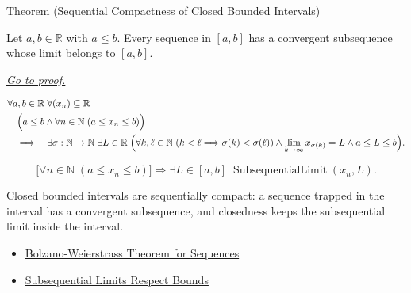 
\begin{theorembox}{Theorem (Sequential Compactness of Closed Bounded Intervals)}
\begin{theorem}
\label{thm:sequential-compactness-closed-bounded-interval}
Let $a,b\in\mathbb{R}$ with $a\le b$. Every sequence in $[a,b]$ has a
convergent subsequence whose limit belongs to $[a,b]$.

\smallskip
\noindent
\hyperref[prf:sequential-compactness-closed-bounded-interval]{\textit{Go to proof.}}
\end{theorem}
\end{theorembox}

\begin{remark*}
\[
\begin{aligned}
&\forall a,b\in\mathbb{R}\;\forall (x_n)\subseteq\mathbb{R}\\
&\quad\Bigl(
  a\le b
  \land
  \forall n\in\mathbb{N}\;(a\le x_n\le b)
\Bigr)\\
&\quad\Longrightarrow\quad
\exists \sigma:\mathbb{N}\to\mathbb{N}\;\exists L\in\mathbb{R}\;
\Bigl(
  \forall k,\ell\in\mathbb{N}\;(k<\ell\Longrightarrow\sigma(k)<\sigma(\ell))
  \land
  \lim_{k\to\infty}x_{\sigma(k)}=L
  \land
  a\le L\le b
\Bigr).
\end{aligned}
\]
\end{remark*}

\begin{remark*}
\[
\bigl[\forall n\in\mathbb{N}\;(a\le x_n\le b)\bigr]
\Longrightarrow
\exists L\in[a,b]\;\operatorname{SubsequentialLimit}(x_n,L).
\]
\end{remark*}

\begin{remark*}[Interpretation]
Closed bounded intervals are sequentially compact: a sequence trapped in the
interval has a convergent subsequence, and closedness keeps the subsequential
limit inside the interval.
\end{remark*}

\begin{dependencies}
\begin{itemize}
  \item \hyperref[thm:bolzano-weierstrass-sequences]{Bolzano-Weierstrass Theorem for Sequences}
  \item \hyperref[thm:subsequential-limits-respect-bounds]{Subsequential Limits Respect Bounds}
\end{itemize}
\end{dependencies}
